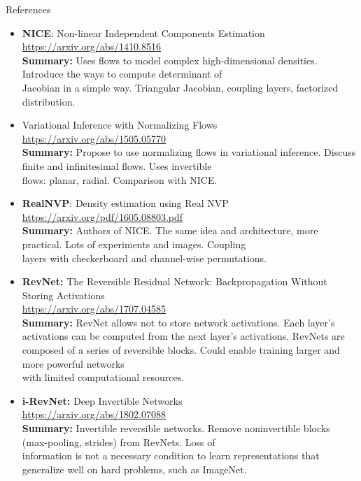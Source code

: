 \documentclass{beamer}
\begin{document}
\begin{frame}{References}
	{\tiny
		\begin{itemize}
			
			\item \textbf{NICE}: Non-linear Independent Components Estimation \\
			\href{https://arxiv.org/abs/1410.8516}{https://arxiv.org/abs/1410.8516} \\
			\textbf{Summary:} Uses flows to model complex high-dimensional densities. Introduce the ways to compute determinant of \\ Jacobian
			 in a simple way. Triangular Jacobian, coupling layers, factorized distribution.
			
			\item Variational Inference with Normalizing Flows \\
			\href{https://arxiv.org/abs/1505.05770}{https://arxiv.org/abs/1505.05770} \\
			\textbf{Summary:} Propose to use normalizing flows in variational inference. Discuss finite and infinitesimal flows. Uses invertible \\
			flows: planar, radial. Comparison with NICE.
			
			\item \textbf{RealNVP}: Density estimation using Real NVP \\
			\href{https://arxiv.org/pdf/1605.08803.pdf}{https://arxiv.org/pdf/1605.08803.pdf} \\
			\textbf{Summary:} Authors of NICE. The same idea and architecture, more practical. Lots of experiments and images. Coupling\\ layers with checkerboard and channel-wise permutations.
			
			\item \textbf{RevNet:} The Reversible Residual Network: Backpropagation Without Storing Activations \\
			\href{https://arxiv.org/abs/1707.04585}{https://arxiv.org/abs/1707.04585} \\
			\textbf{Summary:} RevNet allows not to store network activations. Each layer’s activations can be computed from the next layer’s activations. RevNets are composed of a series of reversible blocks. Could enable training larger and more powerful networks \\
			with limited computational resources. 
			
			\item \textbf{i-RevNet:} Deep Invertible Networks \\
			\href{https://arxiv.org/abs/1802.07088}{https://arxiv.org/abs/1802.07088} \\
			\textbf{Summary:} Invertible reversible networks. Remove noninvertible blocks (max-pooling, strides) from RevNets. Loss of \\
			information is not a necessary condition to learn representations that generalize well on hard problems, such as ImageNet.
			

\end{itemize}}
\end{frame}
\end{document}
